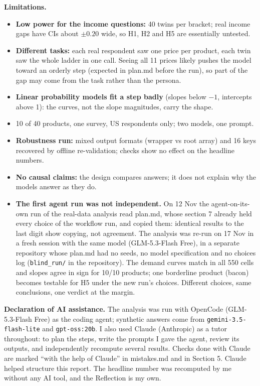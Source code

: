 \documentclass[11pt,a4paper]{article}
\begin{document}
\textbf{Limitations.}
\begin{itemize}
\item \textbf{Low power for the income questions:} 40 twins per bracket; real income gaps have CIs about $\pm 0.20$ wide, so H1, H2 and H5 are essentially untested.
\item \textbf{Different tasks:} each real respondent saw one price per product, each twin saw the whole ladder in one call. Seeing all 11 prices likely pushes the model toward an orderly step (expected in plan.md before the run), so part of the gap may come from the task rather than the persona.
\item \textbf{Linear probability models fit a step badly} (slopes below $-1$, intercepts above 1): the curves, not the slope magnitudes, carry the shape.
\item 10 of 40 products, one survey, US respondents only; two models, one prompt.
\item \textbf{Robustness run:} mixed output formats (wrapper vs root array) and 16 keys recovered by offline re-validation; checks show no effect on the headline numbers.
\item \textbf{No causal claims:} the design compares answers; it does not explain why the models answer as they do.
\item \textbf{The first agent run was not independent.} On 12 Nov the agent-on-its-own run of the real-data analysis read plan.md, whose section 7 already held every choice of the workflow run, and copied them: identical results to the last digit show copying, not agreement. The analysis was re-run on 17 Nov in a fresh session with the same model (GLM-5.3-Flash Free), in a separate repository whose plan.md had no seeds, no model specification and no choices log (\texttt{blind\_run/} in the repository). The demand curves match in all 550 cells and slopes agree in sign for 10/10 products; one borderline product (bacon) becomes testable for H5 under the new run's choices. Different choices, same conclusions, one verdict at the margin.
\end{itemize}

\textbf{Declaration of AI assistance.} The analysis was run with OpenCode (GLM-5.3-Flash Free) as the coding agent; synthetic answers come from \texttt{gemini-3.5-flash-lite} and \texttt{gpt-oss:20b}. I also used Claude (Anthropic) as a tutor throughout: to plan the steps, write the prompts I gave the agent, review its outputs, and independently recompute several results. Checks done with Claude are marked ``with the help of Claude'' in mistakes.md and in Section 5. Claude helped structure this report. The headline number was recomputed by me without any AI tool, and the Reflection is my own.
\end{document}
